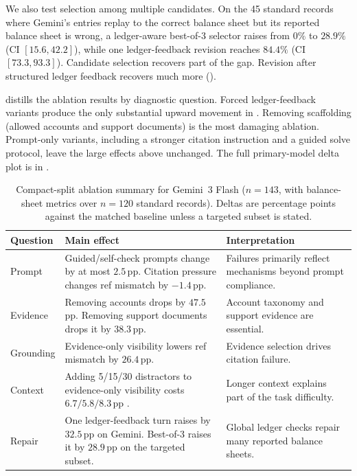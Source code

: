 We also test selection among multiple candidates. On the 45 standard records where Gemini's entries replay to the correct balance sheet but its reported balance sheet is wrong, a ledger-aware best-of-3 selector raises \bsexact{} from $0\%$ to $28.9\%$ (CI $[15.6,42.2]$), while one ledger-feedback revision reaches $84.4\%$ (CI $[73.3,93.3]$). Candidate selection recovers part of the gap. Revision after structured ledger feedback recovers much more ().

 distills the ablation results by diagnostic question. Forced ledger-feedback variants produce the only substantial upward movement in \bsexact{}. Removing scaffolding (allowed accounts and support documents) is the most damaging ablation. Prompt-only variants, including a stronger citation instruction and a guided solve protocol, leave the large effects above unchanged. The full primary-model delta plot is in .

\begin{table}[t]
\centering
\footnotesize
\setlength{\tabcolsep}{2.4pt}
\renewcommand{\arraystretch}{1.08}
\begin{tabularx}{\linewidth}{@{}p{1.7cm}p{2.55cm}X@{}}
\toprule
Question & Main effect & Interpretation \\
\midrule
Prompt & Guided/self-check prompts change \bsexact{} by at most $2.5$\,pp. Citation pressure changes ref mismatch by $-1.4$\,pp. & Failures primarily reflect mechanisms beyond prompt compliance. \\
Evidence & Removing accounts drops \bsrecon{} by $47.5$\,pp. Removing support documents drops it by $38.3$\,pp. & Account taxonomy and support evidence are essential. \\
Grounding & Evidence-only visibility lowers ref mismatch by $26.4$\,pp. & Evidence selection drives citation failure. \\
Context & Adding 5/15/30 distractors to evidence-only visibility costs $6.7/5.8/8.3$\,pp \bsrecon{}. & Longer context explains part of the task difficulty. \\
Repair & One ledger-feedback turn raises \bsexact{} by $32.5$\,pp on Gemini. Best-of-3 raises it by $28.9$\,pp on the targeted subset. & Global ledger checks repair many reported balance sheets. \\
\bottomrule
\end{tabularx}
\caption{Compact-split ablation summary for Gemini~3 Flash ($n{=}143$, with balance-sheet metrics over $n{=}120$ standard records). Deltas are percentage points against the matched baseline unless a targeted subset is stated.}
\label{tab:ablation-summary}
\end{table}

